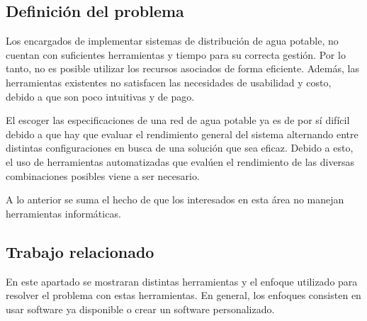 \documentclass[11pt,letterpaper]{article}
\begin{document}
\subsection{Definición del problema} 

Los encargados de implementar sistemas de distribución de agua potable, no cuentan con suficientes herramientas y  tiempo para su correcta gestión. Por lo tanto, no es posible utilizar los recursos asociados de forma eficiente. Además, las herramientas existentes no satisfacen las necesidades de usabilidad y costo, debido a que son poco intuitivas y de pago.

El escoger las especificaciones de una red de agua potable ya es de por sí difícil debido a que hay que evaluar el rendimiento general del sistema alternando entre distintas configuraciones en busca de una solución que sea eficaz. Debido a esto, el uso de herramientas automatizadas que evalúen el rendimiento de las diversas combinaciones posibles viene a ser necesario.

A lo anterior se suma el hecho de que los interesados en esta área no manejan herramientas informáticas.




\subsection{Trabajo relacionado} 

En este apartado se mostraran distintas herramientas y el enfoque utilizado para resolver el problema con estas herramientas. En general, los enfoques consisten en usar software ya disponible o crear un software personalizado.
\end{document}
